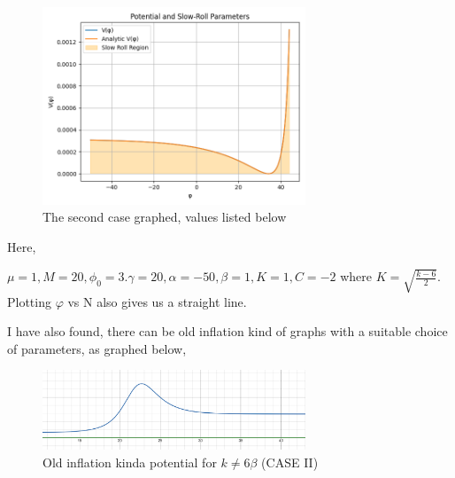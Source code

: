 \documentclass{article}
\begin{document}
\begin{figure}[h!]
    \centering
    \includegraphics[width=0.7\textwidth]{Python/Figures/New Potenial with gravity.png}
    \caption{The second case graphed, values listed below}
    \label{New potential}
\end{figure}

Here,

$\mu = 1    ,M = 20     ,\phi_0 = 3   .\gamma = 20 ,\alpha = -50,\beta = 1 ,K = 1, C = -2  $
where $K = \sqrt{\frac{k-6}{2}}$. Plotting $\varphi$ vs N also gives us a straight line.

I have also found, there can be old inflation kind of graphs with a suitable choice of parameters, as graphed below,

\begin{figure}[h!]
    \centering
    \includegraphics[width=0.7\textwidth]{LaTeX/CASE II Potential.png}
    \caption{Old inflation kinda potential for $k \neq 6\beta$ (CASE II)}
    \label{Old inflation}
\end{figure}

\end{document}
